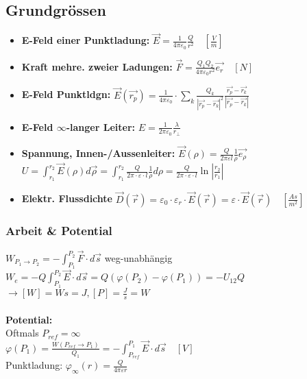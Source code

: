 \documentclass[a4paper, 11pt]{scrartcl}
\newcommand{\dis}[1]{\hspace{#1cm}}
\begin{document}
\begin{multicols*}{2}
				\subsection{Grundgrössen}
				\begin{itemize}
					\item \textbf{E-Feld einer Punktladung:} $\vec{E}=\frac{1}{4\pi\varepsilon_0}\frac{Q}{r^2} \quad [\frac{V}{m}]$
					\item \textbf{Kraft mehre. zweier Ladungen:} $\vec{F}=\frac{Q_1Q_2}{4\pi\varepsilon_0r^2}\vec{e_r} \quad [N]$
					\item \textbf{E-Feld Punktldgn:}
					$\vec{E}(\vec{r_p})=\frac{1}{4\pi\varepsilon_0}\cdot\sum_k\frac{Q_k}{|\vec{r_p}-\vec{r_k}|^2}\frac{\vec{r_p}-\vec{r_k}}{|\vec{r_p}-\vec{r_k}|}$
					\item \textbf{E-Feld $\infty$-langer Leiter:} $E=\frac{1}{2\pi\varepsilon_0}\frac{\lambda}{r_\bot}$
					\item \textbf{Spannung, Innen-/Aussenleiter:} $\vec{E}(\rho)=\frac{Q}{2\pi\varepsilon l}\frac{1}{\rho}\vec{e_{\rho}}$\\
					$\displaystyle{U=\int_{r_1}^{r_2}{\vec{E}(\rho)}d\vec{\rho}=\int_{r_1}^{r_2}{\frac{Q}{2\pi\cdot\varepsilon\cdot l}\frac{1}{\rho}}d\rho}=\frac{Q}{2\pi\cdot\varepsilon\cdot l}\ln{\left| \frac{r_2}{r_1} \right|}$\\
					
					 \item \textbf{Elektr. Flussdichte }$\vec{D}(\vec{r})=\varepsilon_0\cdot\varepsilon_r\cdot\vec{E}(\vec{r})=\varepsilon\cdot\vec{E}(\vec{r})\quad [\frac{As}{m^2}]$
				\end{itemize}

				\subsubsection{Arbeit \& Potential }
				$W_{P_1\rightarrow P_2}=-\int_{P_1}^{P_2}{\vec{F}\cdot}d\vec{s}$ \dis{0.5} weg-unabhängig\\
				$W_{e}=-Q\int_{P_1}^{P_2}{\vec{E}\cdot}d\vec{s}=Q\left(\varphi(P_2)-\varphi(P_1)\right)=-U_{12}Q$\\
				$\rightarrow [W]=Ws=J, [P]=\frac{J}{s}=W$\\ \\
				\textbf{Potential:}\\
				Oftmals $P_{ref}=\infty$\\
				$\varphi(P_1)=\frac{W(P_{ref}\rightarrow P_1)}{Q_1}=-\int_{P_{ref}}^{P_1}{\vec{E}\cdot}d\vec{s} \quad [V]$ \\
				Punktladung: $\varphi_{\infty}(r) = \frac{Q}{4\pi\varepsilon r}$
			

\end{multicols*}
\end{document}
